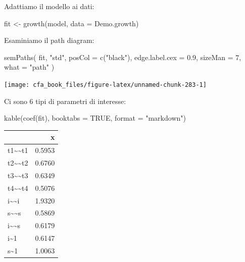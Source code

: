 \documentclass[
  11pt,
]{krantz}
\makeatletter
\newenvironment{Shaded}{\begin{snugshade}}{\end{snugshade}}
\newcommand{\AttributeTok}[1]{\textcolor[rgb]{0.61,0.61,0.61}{#1}}
\newcommand{\ConstantTok}[1]{\textcolor[rgb]{0,0,0}{#1}}
\newcommand{\DecValTok}[1]{\textcolor[rgb]{0.06,0.06,0.06}{#1}}
\newcommand{\FloatTok}[1]{\textcolor[rgb]{0.06,0.06,0.06}{#1}}
\newcommand{\FunctionTok}[1]{\textcolor[rgb]{0,0,0}{#1}}
\newcommand{\NormalTok}[1]{#1}
\newcommand{\OtherTok}[1]{\textcolor[rgb]{0.37,0.37,0.37}{#1}}
\newcommand{\StringTok}[1]{\textcolor[rgb]{0.5,0.5,0.5}{#1}}
\newenvironment{kframe}{%
\medskip{}
\setlength{\fboxsep}{.8em}
 \def\at@end@of@kframe{}%
 \ifinner\ifhmode%
  \def\at@end@of@kframe{\end{minipage}}%
  \begin{minipage}{\columnwidth}%
 \fi\fi%
 \def\FrameCommand##1{\hskip\@totalleftmargin \hskip-\fboxsep
 \colorbox{shadecolor}{##1}\hskip-\fboxsep
     \hskip-\linewidth \hskip-\@totalleftmargin \hskip\columnwidth}%
 \MakeFramed {\advance\hsize-\width
   \@totalleftmargin\z@ \linewidth\hsize
   \@setminipage}}%
 {\par\unskip\endMakeFramed%
 \at@end@of@kframe}
\renewenvironment{Shaded}{\begin{kframe}}{\end{kframe}}
\theoremstyle{definition}
\theoremstyle{definition}
\theoremstyle{definition}
\theoremstyle{definition}
\theoremstyle{remark}
\makeatother
\begin{document}
Adattiamo il modello ai dati:

\begin{Shaded}
\begin{Highlighting}[]
\NormalTok{fit }\OtherTok{\textless{}{-}} \FunctionTok{growth}\NormalTok{(model, }\AttributeTok{data =}\NormalTok{ Demo.growth)}
\end{Highlighting}
\end{Shaded}

Esaminiamo il path diagram:

\begin{Shaded}
\begin{Highlighting}[]
\FunctionTok{semPaths}\NormalTok{(}
\NormalTok{  fit, }\StringTok{"std"}\NormalTok{,}
  \AttributeTok{posCol =} \FunctionTok{c}\NormalTok{(}\StringTok{"black"}\NormalTok{),}
  \AttributeTok{edge.label.cex =} \FloatTok{0.9}\NormalTok{,}
  \AttributeTok{sizeMan =} \DecValTok{7}\NormalTok{,}
  \AttributeTok{what =} \StringTok{"path"}
\NormalTok{)}
\end{Highlighting}
\end{Shaded}

\begin{center}\texttt{[image: cfa\_book\_files/figure-latex/unnamed-chunk-283-1]} \end{center}

Ci sono 6 tipi di parametri di interesse:

\begin{Shaded}
\begin{Highlighting}[]
\FunctionTok{kable}\NormalTok{(}\FunctionTok{coef}\NormalTok{(fit), }\AttributeTok{booktabs =} \ConstantTok{TRUE}\NormalTok{, }\AttributeTok{format =} \StringTok{"markdown"}\NormalTok{)}
\end{Highlighting}
\end{Shaded}

\begin{longtable}[]{@{}lr@{}}
\toprule
& x \\
\midrule
\endhead
t1\textasciitilde\textasciitilde t1 & 0.5953 \\
t2\textasciitilde\textasciitilde t2 & 0.6760 \\
t3\textasciitilde\textasciitilde t3 & 0.6349 \\
t4\textasciitilde\textasciitilde t4 & 0.5076 \\
i\textasciitilde\textasciitilde i & 1.9320 \\
s\textasciitilde\textasciitilde s & 0.5869 \\
i\textasciitilde\textasciitilde s & 0.6179 \\
i\textasciitilde1 & 0.6147 \\
s\textasciitilde1 & 1.0063 \\
\bottomrule
\end{longtable}
\end{document}
